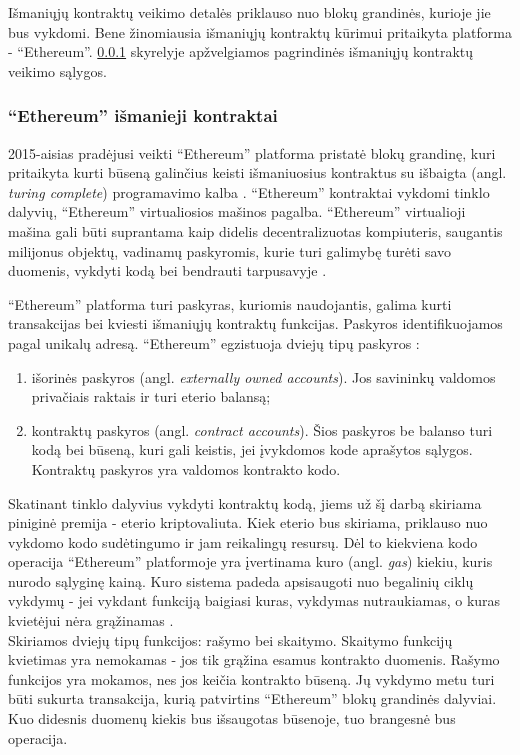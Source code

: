 Išmaniųjų kontraktų veikimo detalės priklauso nuo blokų grandinės, kurioje jie bus vykdomi.
Bene žinomiausia išmaniųjų kontraktų kūrimui pritaikyta platforma - \enquote{Ethereum}.
\hypertarget{section:ethereumIntro}{\ref{section:ethereumIntro}} skyrelyje apžvelgiamos pagrindinės išmaniųjų kontraktų
veikimo sąlygos.

\subsubsection{\enquote{Ethereum} išmanieji kontraktai} \label{section:ethereumIntro}

2015-aisias pradėjusi veikti \enquote{Ethereum} platforma pristatė blokų grandinę, kuri pritaikyta kurti būseną galinčius keisti
išmaniuosius kontraktus su išbaigta
(angl. \textit{turing complete}) programavimo kalba \cite{EthereumWhitePaper}. \enquote{Ethereum} kontraktai vykdomi tinklo
dalyvių, \enquote{Ethereum} virtualiosios mašinos pagalba.  \enquote{Ethereum} virtualioji mašina gali būti suprantama kaip didelis decentralizuotas
kompiuteris, saugantis milijonus objektų, vadinamų paskyromis, kurie turi galimybę turėti savo duomenis,
vykdyti kodą bei bendrauti tarpusavyje \cite{Ethereum}.

\enquote{Ethereum} platforma turi paskyras, kuriomis naudojantis, galima kurti transakcijas bei kviesti išmaniųjų
kontraktų funkcijas. Paskyros identifikuojamos pagal unikalų adresą. \enquote{Ethereum} egzistuoja dviejų tipų paskyros \cite{Ethereum}:

\begin{enumerate}
    \item išorinės paskyros (angl. \textit{externally owned accounts}). Jos savininkų valdomos privačiais raktais ir turi eterio
    balansą;
    \item kontraktų paskyros (angl. \textit{contract accounts}). Šios paskyros be balanso turi kodą bei būseną, kuri gali keistis,
    jei įvykdomos kode aprašytos sąlygos. Kontraktų paskyros yra valdomos kontrakto kodo.
\end{enumerate}

Skatinant tinklo dalyvius vykdyti kontraktų kodą, jiems už šį darbą skiriama piniginė premija - eterio kriptovaliuta. Kiek eterio
bus skiriama, priklauso nuo vykdomo kodo sudėtingumo ir jam reikalingų resursų. Dėl to kiekviena kodo operacija \enquote{Ethereum} platformoje
yra įvertinama kuro (angl. \textit{gas}) kiekiu, kuris nurodo sąlyginę kainą. Kuro sistema padeda apsisaugoti nuo begalinių ciklų vykdymų - jei vykdant
funkciją baigiasi kuras, vykdymas nutraukiamas, o kuras kvietėjui nėra grąžinamas \cite{EthereumWhitePaper}.\\
Skiriamos dviejų tipų funkcijos: rašymo bei skaitymo. Skaitymo funkcijų kvietimas yra nemokamas - jos tik grąžina
esamus kontrakto duomenis. Rašymo funkcijos yra mokamos, nes jos keičia kontrakto būseną. Jų vykdymo metu turi būti sukurta transakcija,
kurią patvirtins \enquote{Ethereum} blokų grandinės dalyviai. Kuo didesnis duomenų kiekis bus išsaugotas būsenoje, tuo brangesnė bus operacija.

